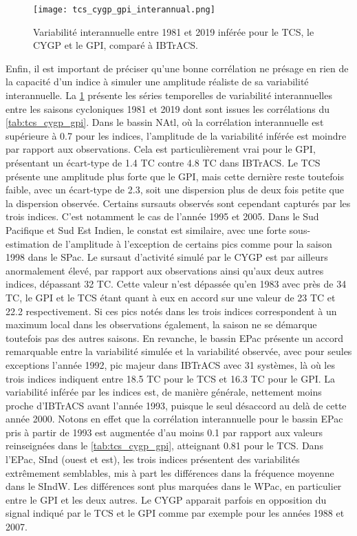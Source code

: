 \documentclass[../main.tex]{subfiles}
\begin{document}
\begin{figure}[tb]
    \centering
    \texttt{[image: tcs\_cygp\_gpi\_interannual.png]}
    \caption{Variabilité interannuelle entre 1981 et 2019 inférée pour le TCS, le CYGP et le GPI, comparé à IBTrACS.}
    \label{fig:tcs_cygp_gpi_variabilite}
\end{figure}

Enfin, il est important de préciser qu'une bonne corrélation ne présage en rien de la capacité d'un indice à simuler une amplitude réaliste de sa variabilité
interannuelle. La \cref{fig:tcs_cygp_gpi_variabilite} présente les séries temporelles de variabilité interannuelles entre les saisons cycloniques \num{1981} et
\num{2019} dont sont issues les corrélations du \cref{tab:tcs_cygp_gpi}. Dans le bassin NAtl, où la corrélation interannuelle est supérieure à \num{0.7} pour
les indices, l'amplitude de la variabilité inférée est moindre par rapport aux observations. Cela est particulièrement vrai pour le GPI, présentant un
écart-type de \num{1.4} TC contre \num{4.8} TC dans IBTrACS. Le TCS présente une amplitude plus forte que le GPI, mais cette dernière reste toutefois faible,
avec un écart-type de \num{2.3}, soit une dispersion plus de deux fois petite que la dispersion observée. Certains sursauts observés sont cependant capturés par
les trois indices. C'est notamment le cas de l'année \num{1995} et \num{2005}. Dans le Sud Pacifique et Sud Est Indien, le constat est similaire, avec une forte
sous-estimation de l'amplitude à l'exception de certains pics comme pour la saison \num{1998} dans le SPac. Le sursaut d'activité simulé par le CYGP est par
ailleurs anormalement élevé, par rapport aux observations ainsi qu'aux deux autres indices, dépassant \num{32} TC. Cette valeur n'est dépassée qu'en \num{1983}
avec près de \num{34} TC, le GPI et le TCS étant quant à eux en accord sur une valeur de \num{23} TC et \num{22.2} respectivement. Si ces pics notés dans les
trois indices correspondent à un maximum local dans les observations également, la saison ne se démarque toutefois pas des autres saisons. En revanche, le
bassin EPac présente un accord remarquable entre la variabilité simulée et la variabilité observée, avec pour seules exceptions l'année \num{1992}, pic majeur
dans IBTrACS avec \num{31} systèmes, là où les trois indices indiquent entre \num{18.5} TC pour le TCS et \num{16.3} TC pour le GPI. La variabilité inférée par
les indices est, de manière générale, nettement moins proche d'IBTrACS avant l'année \num{1993}, puisque le seul désaccord au delà de cette année \num{2000}.
Notons en effet que la corrélation interannuelle pour le bassin EPac pris à partir de \num{1993} est augmentée d'au moins \num{0.1} par rapport aux valeurs
reinseignées dans le \cref{tab:tcs_cygp_gpi}, atteignant \num{0.81} pour le TCS. Dans l'EPac, SInd (ouest et est), les trois indices présentent des variabilités
extrêmement semblables, mis à part les différences dans la fréquence moyenne dans le SIndW. Les différences sont plus marquées dans le WPac, en particulier
entre le GPI et les deux autres. Le CYGP apparait parfois en opposition du signal indiqué par le TCS et le GPI comme par exemple pour les années \num{1988} et
\num{2007}.
\end{document}
